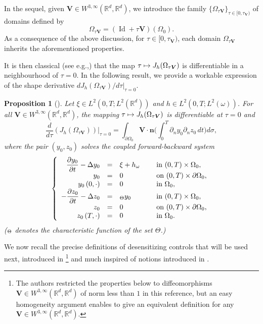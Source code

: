 \documentclass[11pt]{article}
\makeatletter
\newcommand{\eg}{e.g.,\xspace}
\numberwithin{equation}{section}
\newcommand\mto{\mathchoice{\longmapsto}{\mapsto}{\mapsto}{\mapsto}}
\newcommand{\bn}{\boldsymbol{n}}
\newcommand{\bV}{\boldsymbol{V}}
\DeclareMathOperator{\Id}{Id}
\DeclareRobustCommand{\mathbbm}[1]{\csname jepbb@#1\endcsname}
\newcommand\R{{\mathbb R}}
\newtheorem{proposition}[theorem]{Proposition}
\theoremstyle{definition}
\makeatother
\begin{document}
In the sequel, given $\bV\in W^{3,\infty}(\R^d, \R^d)$, we introduce the family $\{\Omega_{\tau\bV}\}_{\tau\in [0,\tau_{\bV})}$ of domains defined by
\[
\Omega_{\tau\bV}= (\Id+\tau\bV)(\Omega_0).
\]
As a consequence of the above discussion, for $\tau \in [0,\tau_{\bV})$, each domain $\Omega_{\tau\bV}$ inherits the aforementioned properties.

It is then classical (see \eg \cite[Chap.\,5]{Henrot-Pierre-2005}) that the map $\tau \mto J_h(\Omega_{\tau\bV})$ is differentiable in a neighbourhood of $\tau = 0$. In the following result, we provide a workable expression of the shape derivative $dJ_h(\Omega_{\tau\bV})/d\tau|_{\tau=0}$.

\begin{proposition}[{\cite[Proof of Prop.\,1.1]{Lissy-Privat-Simpore}}]
\label{Prop-J-differentiable}
Let $\xi \in L^2(0,T; L^2(\R^d))$ and $h \in L^2(0,T; L^2(\omega))$. For all $ \bV \in W^{3, \infty} (\R^d, \R^d)$, the mapping $\tau \mto J_h(\Omega_{\tau\bV})$ is differentiable at $\tau = 0$ and
\begin{equation}
\dfrac{d }{d \tau}\left({J}_h\left(\Omega_{\tau\bV} \right)\right)\Big|_{\tau=0}
\label{Diff-J-V-2}
=
\int_{\partial\Omega_0} \bV \cdot \bn \biggl(\int_0^T \partial_n y_0 \partial_n z_0 \, dt\biggr) d\sigma,
\end{equation}
where the pair $(y_0,z_0)$ solves the coupled forward-backward system
\begin{equation}
\label{y-Omega-0-h}
\left\{
\begin{array}{rcll}
\dfrac{\partial y_0}{\partial t}-\Delta y_0 &=&\xi +h\mathbbm{1}_{\omega}\quad&\text{ in }(0,T) \times \Omega_0,
\\
y_0 &=& 0 &\text{ on }(0,T) \times \partial \Omega_0,
\\
y_0\left(0,\cdot\right) &=& 0 &\text{ in }\Omega_0,
\\
-\dfrac{\partial z_0}{\partial t}-\Delta z_0 &=&\mathbbm{1}_{\Theta}y_0 &\text{ in }(0,T) \times \Omega_0,
\\
z_0 &=& 0 &\text{ on }(0,T) \times \partial \Omega_0,
\\
z_0\left(T,\cdot\right) &=& 0 &\text{ in }\Omega_0.
\end{array}
\right.
\end{equation}
($\mathbbm{1}_\Theta$ denotes the characteristic function of the set $\Theta$.)
\end{proposition}

We now recall the precise definitions of desensitizing controls that will be used next, introduced in \cite[Def.\,1.1]{Lissy-Privat-Simpore}\footnote{The authors restricted the properties below to diffeomorphisms \hbox{$\bV \!\in\! W^{3,\infty}(\R^d, \R^d)$} of norm less than $1$ in this reference, but an easy homogeneity argument enables to give an equivalent definition for any $\mathbf V \in W^{3,\infty}(\R^d, \R^d)$.} and much inspired of notions introduced in \cite{Lions-Sentinelles-1992,Bodart-Fabre}.
\end{document}
